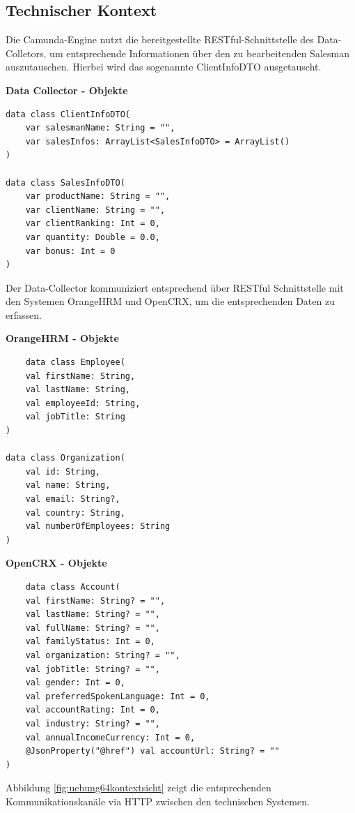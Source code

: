 \documentclass[]{article}
\begin{document}
\hypertarget{_technischer_kontext}{%
\subsection{Technischer Kontext}\label{_technischer_kontext}}

Die Camunda-Engine nutzt die bereitgestellte RESTful-Schnittstelle des Data-Colletors, um entsprechende Informationen über den zu bearbeitenden Salesman auszutauschen.
Hierbei wird das sogenannte ClientInfoDTO ausgetauscht.

\textbf{Data Collector - Objekte}
\begin{verbatim}
data class ClientInfoDTO(
    var salesmanName: String = "",
    var salesInfos: ArrayList<SalesInfoDTO> = ArrayList()
)

data class SalesInfoDTO(
    var productName: String = "",
    var clientName: String = "",
    var clientRanking: Int = 0,
    var quantity: Double = 0.0,
    var bonus: Int = 0
)
\end{verbatim}

Der Data-Collector kommuniziert entsprechend über RESTful Schnittstelle mit den Systemen OrangeHRM und OpenCRX, um die entsprechenden Daten zu erfassen.

\textbf{OrangeHRM - Objekte}
\begin{verbatim}
	data class Employee(
    val firstName: String,
    val lastName: String,
    val employeeId: String,
    val jobTitle: String
)

data class Organization(
    val id: String,
    val name: String,
    val email: String?,
    val country: String,
    val numberOfEmployees: String
)
\end{verbatim}

\textbf{OpenCRX - Objekte}
\begin{verbatim}
	data class Account(
    val firstName: String? = "",
    val lastName: String? = "",
    val fullName: String? = "",
    val familyStatus: Int = 0,
    val organization: String? = "",
    val jobTitle: String? = "",
    val gender: Int = 0,
    val preferredSpokenLanguage: Int = 0,
    val accountRating: Int = 0,
    val industry: String? = "",
    val annualIncomeCurrency: Int = 0,
    @JsonProperty("@href") val accountUrl: String? = ""
)
\end{verbatim}

Abbildung \ref{fig:uebung64kontextsicht} zeigt die entsprechenden Kommunikationskanäle via HTTP zwischen den technischen Systemen.
\end{document}

